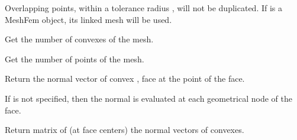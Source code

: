 \documentclass[a4paper,11pt,english]{sphinxmanual}
\begin{document}
\begin{fulllineitems}
\begin{fulllineitems}
Overlapping points, within a tolerance radius , will not be
duplicated. If  is a MeshFem object, its linked mesh will be used.

\end{fulllineitems}


\begin{fulllineitems}
\label{\detokenize{python/cmdref_Mesh:getfem.Mesh.nbcvs}}
Get the number of convexes of the mesh.

\end{fulllineitems}


\begin{fulllineitems}
\label{\detokenize{python/cmdref_Mesh:getfem.Mesh.nbpts}}
Get the number of points of the mesh.

\end{fulllineitems}


\begin{fulllineitems}
\label{\detokenize{python/cmdref_Mesh:getfem.Mesh.normal_of_face}}
Return the normal vector of convex , face  at the  point of the face.

If  is not specified, then the normal is evaluated at each
geometrical node of the face.

\end{fulllineitems}


\begin{fulllineitems}
\label{\detokenize{python/cmdref_Mesh:getfem.Mesh.normal_of_faces}}
Return matrix of (at face centers) the normal vectors of convexes.


\end{fulllineitems}
\end{fulllineitems}
\end{document}
